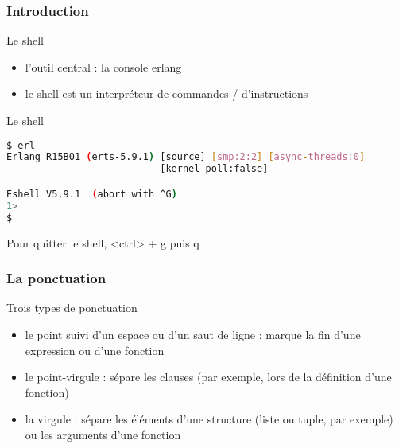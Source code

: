 \begin{frame}[fragile]
  \frametitle{Introduction}

  \begin{block}{Le shell}
    \begin{itemize}
      \item l'outil central : la console erlang
      \item le shell est un interpréteur de commandes / d'instructions
    \end{itemize}
  \end{block}

  \begin{exampleblock}{Le shell}
    \begin{lstlisting}[language=bash]
$ erl
Erlang R15B01 (erts-5.9.1) [source] [smp:2:2] [async-threads:0]
                           [kernel-poll:false]

Eshell V5.9.1  (abort with ^G)
1>
$
    \end{lstlisting}
  \end{exampleblock}

  \begin{alertblock}{}
    Pour quitter le shell, <ctrl> + g puis q
  \end{alertblock}

\end{frame}

\begin{frame}[fragile]
  \frametitle{La ponctuation}

  \begin{block}{Trois types de ponctuation}
    \begin{itemize}
      \item le point suivi d'un espace ou d'un saut de ligne : marque la fin
        d'une expression ou d'une fonction
      \item le point-virgule : sépare les clauses (par exemple, lors de la
        définition d'une fonction)
      \item la virgule : sépare les éléments d'une structure (liste ou tuple,
        par exemple) ou les arguments d'une fonction
    \end{itemize}
  \end{block}

\end{frame}

